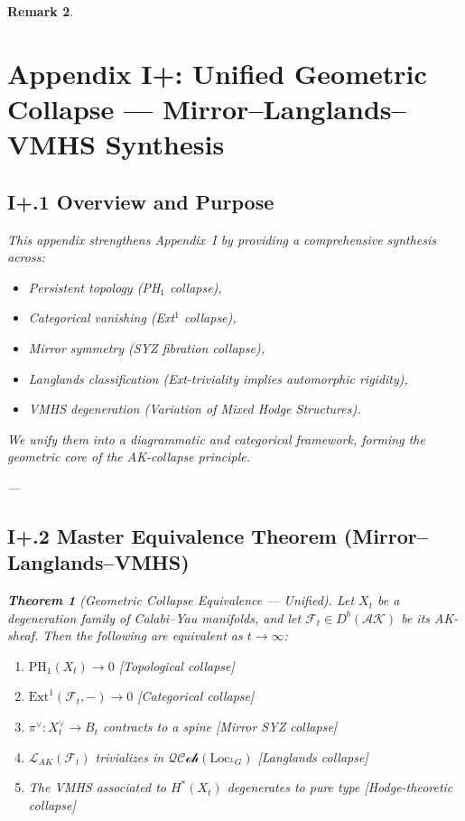 \documentclass[11pt]{article}
\newtheorem{theorem}{Theorem}[section]
\newtheorem{remark}[theorem]{Remark}
\begin{document}
\begin{remark}
\section*{Appendix I+: Unified Geometric Collapse — Mirror–Langlands–VMHS Synthesis}

\subsection*{I+.1 Overview and Purpose}

This appendix strengthens Appendix~I by providing a comprehensive synthesis across:
\begin{itemize}
  \item Persistent topology (PH$_1$ collapse),
  \item Categorical vanishing (Ext$^1$ collapse),
  \item Mirror symmetry (SYZ fibration collapse),
  \item Langlands classification (Ext-triviality implies automorphic rigidity),
  \item VMHS degeneration (Variation of Mixed Hodge Structures).
\end{itemize}

We unify them into a diagrammatic and categorical framework, forming the geometric core of the AK-collapse principle.

---

\subsection*{I+.2 Master Equivalence Theorem (Mirror–Langlands–VMHS)}

\begin{theorem}[Geometric Collapse Equivalence — Unified]
Let \( X_t \) be a degeneration family of Calabi–Yau manifolds, and let \( \mathcal{F}_t \in D^b(\mathcal{AK}) \) be its AK-sheaf. Then the following are equivalent as \( t \to \infty \):
\begin{enumerate}
  \item \( \mathrm{PH}_1(X_t) \to 0 \) \hfill [Topological collapse]
  \item \( \mathrm{Ext}^1(\mathcal{F}_t, -) \to 0 \) \hfill [Categorical collapse]
  \item \( \pi^\vee: X_t^\vee \to B_t \) contracts to a spine \hfill [Mirror SYZ collapse]
  \item \( \mathcal{L}_{AK}(\mathcal{F}_t) \) trivializes in \( \mathcal{QCoh}(\mathrm{Loc}_{^LG}) \) \hfill [Langlands collapse]
  \item The VMHS associated to \( H^*(X_t) \) degenerates to pure type \hfill [Hodge-theoretic collapse]
\end{enumerate}
\end{theorem}


\end{remark}
\end{document}
